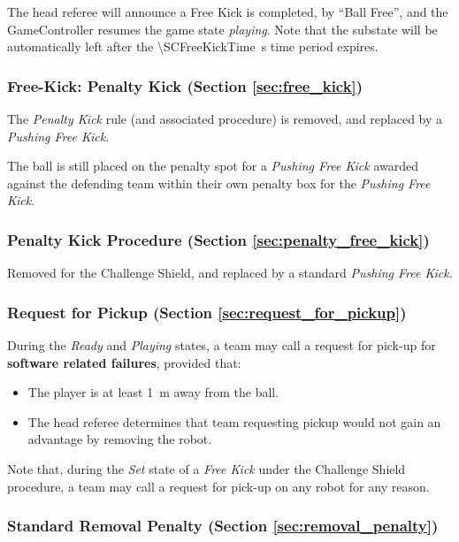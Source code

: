 The head referee will announce a Free Kick is completed, by ``Ball Free'', and the GameController resumes the game state \emph{playing}. Note that the substate will be automatically left after the \qty{\SCFreeKickTime}{\second} time period expires.

\subsubsection{Free-Kick: Penalty Kick (Section \ref{sec:free_kick})}

The \emph{Penalty Kick} rule (and associated procedure) is removed, and replaced by a \emph{Pushing Free Kick}.

The ball is still placed on the penalty spot for a \emph{Pushing Free Kick} awarded against the defending team within their own penalty box for the \emph{Pushing Free Kick}.

\subsubsection{Penalty Kick Procedure (Section \ref{sec:penalty_free_kick})}

Removed for the Challenge Shield, and replaced by a standard \emph{Pushing Free Kick}.

\subsubsection{Request for Pickup (Section \ref{sec:request_for_pickup})}

During the \emph{Ready} and \emph{Playing} states, a team may call a request for pick-up for \textbf{software related failures}, provided that:
\begin{itemize}
    \item The player is at least \qty{1}{\meter} away from the ball.
    \item The head referee determines that team requesting pickup would not gain an advantage by removing the robot.
\end{itemize}

Note that, during the \emph{Set} state of a \emph{Free Kick} under the Challenge Shield procedure, a team may call a request for pick-up on any robot for any reason.

\subsubsection{Standard Removal Penalty (Section \ref{sec:removal_penalty})}

